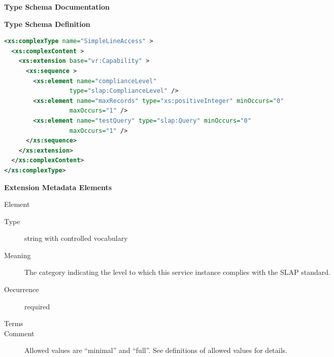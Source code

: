 \documentclass[11pt,a4paper]{ivoa}
\begin{document}
\begin{generated}
\begingroup
        \renewcommand*\descriptionlabel[1]{%
        \hbox to 5.5em{\emph{#1}\hfil}}\vspace{2ex}\noindent\textbf{ Type Schema Documentation}


\vspace{1ex}\noindent\textbf{ Type Schema Definition}

\begin{lstlisting}[language=XML,basicstyle=\footnotesize]
<xs:complexType name="SimpleLineAccess" >
  <xs:complexContent >
    <xs:extension base="vr:Capability" >
      <xs:sequence >
        <xs:element name="complianceLevel"
                  type="slap:ComplianceLevel" />
        <xs:element name="maxRecords" type="xs:positiveInteger" minOccurs="0"
                  maxOccurs="1" />
        <xs:element name="testQuery" type="slap:Query" minOccurs="0"
                  maxOccurs="1" />
      </xs:sequence>
    </xs:extension>
  </xs:complexContent>
</xs:complexType>
\end{lstlisting}

\vspace{0.5ex}\noindent\textbf{ Extension Metadata Elements}

\begingroup\small\begin{bigdescription}\item[Element \xmlel{complianceLevel}]
\begin{description}
\item[Type] string with controlled vocabulary
\item[Meaning] The category indicating the level to which this
                        service instance complies with the SLAP standard.
\item[Occurrence] required

\item[Terms]\hfil
{}
\item[Comment] Allowed values are “minimal” and “full”.
                        See definitions of allowed values for details.


\end{description}
\end{bigdescription}
\end{generated}
\end{document}
